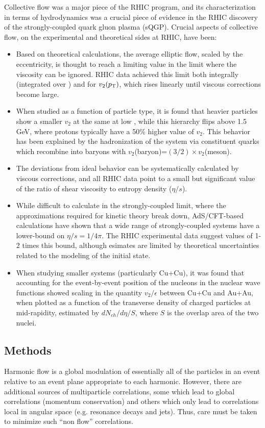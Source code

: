 Collective flow was a major piece of the RHIC program, and its characterization
in terms of hydrodynamics was a crucial piece of evidence in the RHIC discovery
of the strongly-coupled quark gluon plasma (sQGP).  Crucial aspects of collective
flow, on the experimental and theoretical sides at RHIC, have been:
\begin{itemize}
\item Based on theoretical calculations, the average elliptic flow, scaled by the eccentricity, 
is thought to reach a limiting value in the limit where
the viscosity can be ignored.  RHIC data achieved this limit both integrally (integrated over \pT)
and for $v_2(\mbox{$p_{\mathrm{T}}$})$, which rises linearly until viscous corrections become large.
\item When studied as a function of particle type, it is found that heavier particles show
a smaller $v_2$ at the same \pT at low \pT, while this hierarchy flips above 1.5 GeV, where protons
typically have a 50\% higher value of $v_2$.  This behavior has been explained by the hadronization of
the system via constituent quarks which recombine into baryons with $v_2$(baryon)=$(3/2) \times v_2$(meson).
\item The deviations from ideal behavior can be systematically calculated by viscous corrections, and
all RHIC data point to a small but significant value of the ratio of shear viscosity to entropy density ($\eta/s$).
\item While difficult to calculate in the strongly-coupled limit, where the approximations required for kinetic theory break down, AdS/CFT-based calculations have shown that a wide range of strongly-coupled systems have a lower-bound on 
$\eta/s = 1/4\pi$.  The RHIC experimental data suggest values of 1-2 times this bound, although esimates are limited
by theoretical uncertainties related to the modeling of the initial state.
\item When studying smaller systems (particularly Cu+Cu), it was found that accounting for the event-by-event position of the nucleons in the nuclear wave functions showed scaling in the quantity $v_2/\epsilon$ between Cu+Cu and Au+Au, when
plotted as a function of the transverse density of charged particles at mid-rapidity, estimated by $dN_{ch}/d\eta/S$,
where $S$ is the overlap area of the two nuclei.
\end{itemize}

\subsection{Methods}
\label{subsect:pas:flow:methods}
Harmonic flow is a global modulation of essentially all of the particles in an event relative to an event plane 
appropriate to each harmonic.  However, there are additional sources of multiparticle correlations, some which 
lead to global correlations (momentum conservation) and others which only lead to correlations local in angular space
(e.g. resonance decays and jets).  Thus, care must be taken to minimize such ``non flow'' correlations.

